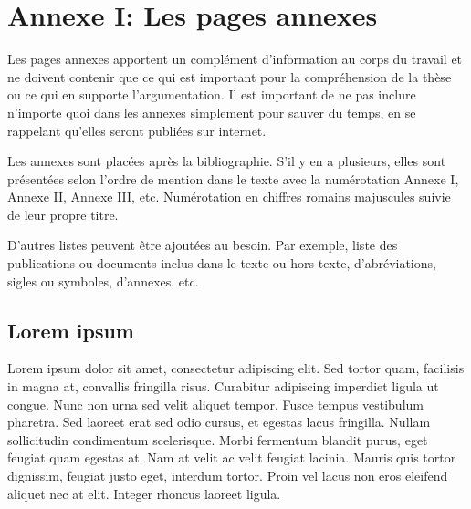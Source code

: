\chapter{Annexe I: Les pages annexes}
Les pages annexes apportent un complément d’information au corps du travail et ne doivent contenir que ce qui est important pour la compréhension de la thèse ou ce qui en supporte l’argumentation. Il est important de ne pas inclure n’importe quoi dans les annexes simplement pour sauver du temps, en se rappelant qu’elles seront publiées sur internet.

Les annexes sont placées après la bibliographie. S’il y en a plusieurs, elles sont présentées selon l’ordre de mention dans le texte avec la numérotation Annexe I, Annexe II, Annexe III, etc. Numérotation en chiffres romains majuscules suivie de leur propre titre.

D’autres listes peuvent être ajoutées au besoin. Par exemple, liste des publications ou documents inclus dans le texte ou hors texte, d’abréviations, sigles ou symboles, d’annexes, etc.

\section{Lorem ipsum}
Lorem ipsum dolor sit amet, consectetur adipiscing elit. Sed tortor quam, facilisis in magna at, convallis fringilla risus. Curabitur adipiscing imperdiet ligula ut congue. Nunc non urna sed velit aliquet tempor. Fusce tempus vestibulum pharetra. Sed laoreet erat sed odio cursus, et egestas lacus fringilla. Nullam sollicitudin condimentum scelerisque. Morbi fermentum blandit purus, eget feugiat quam egestas at. Nam at velit ac velit feugiat lacinia. Mauris quis tortor dignissim, feugiat justo eget, interdum tortor. Proin vel lacus non eros eleifend aliquet nec at elit. Integer rhoncus laoreet ligula.
